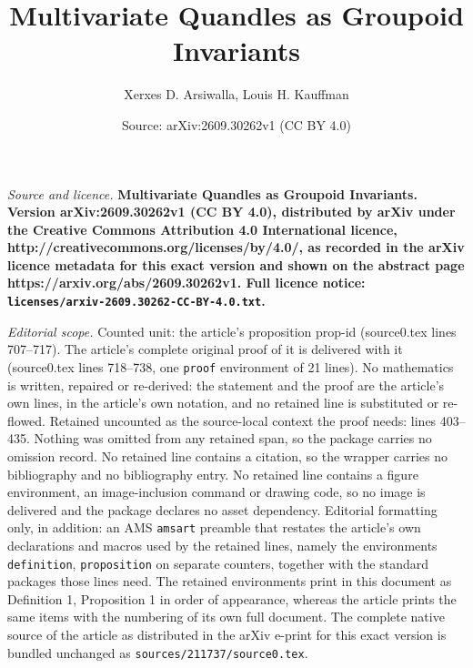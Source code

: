 \documentclass[10pt,a4paper]{amsart}
\title{\bf Multivariate Quandles as Groupoid Invariants}
\author{Xerxes D. Arsiwalla, Louis H. Kauffman}
\date{Source: arXiv:2609.30262v1 (CC BY 4.0)}
\begin{document}
\maketitle

\noindent\emph{Source and licence.} \bf Multivariate Quandles as Groupoid Invariants. Version arXiv:2609.30262v1 (CC BY 4.0), distributed by arXiv under the Creative Commons Attribution 4.0 International licence, http://creativecommons.org/licenses/by/4.0/, as recorded in the arXiv licence metadata for this exact version and shown on the abstract page https://arxiv.org/abs/2609.30262v1. Full licence notice: \texttt{licenses/arxiv-2609.30262-CC-BY-4.0.txt}.\par\smallskip

\noindent\textit{Editorial scope.} Counted unit: the article's proposition prop-id (source0.tex lines 707--717). The article's complete original proof of it is delivered with it (source0.tex lines 718--738, one \texttt{proof} environment of 21 lines). No mathematics is written, repaired or re-derived: the statement and the proof are the article's own lines, in the article's own notation, and no retained line is substituted or re-flowed.  Retained uncounted as the source-local context the proof needs: lines 403--435.  Nothing was omitted from any retained span, so the package carries no omission record.  No retained line contains a citation, so the wrapper carries no bibliography and no bibliography entry.  No retained line contains a figure environment, an image-inclusion command or drawing code, so no image is delivered and the package declares no asset dependency.  Editorial formatting only, in addition: an AMS \texttt{amsart} preamble that restates the article's own declarations and macros used by the retained lines, namely the environments \texttt{definition}, \texttt{proposition} on separate counters, together with the standard packages those lines need.  The retained environments print in this document as Definition 1, Proposition 1 in order of appearance, whereas the article prints the same items with the numbering of its own full document.  The complete native source of the article as distributed in the arXiv e-print for this exact version is bundled unchanged as \texttt{sources/211737/source0.tex}.
\end{document}
